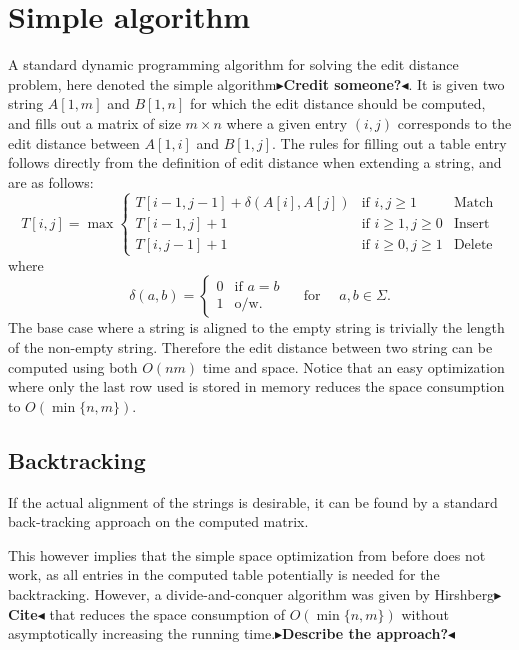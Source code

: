 \documentclass[twoside,11pt,openright]{report}
\newcommand{\todo}[1]{{\color[rgb]{.5,0,0}\textbf{$\blacktriangleright$#1$\blacktriangleleft$}}}
\newcommand{\str}[3]{#1[#2, #3]}
\begin{document}
\section{Simple algorithm}
\label{sec:intro:simple}
A standard dynamic programming algorithm for solving the edit distance problem, here denoted the simple algorithm\todo{Credit someone?}. It is given two string $\str{A}{1}{m}$ and $\str{B}{1}{n}$ for which the edit distance should be computed, and fills out a matrix of size $m \times n$ where a given entry $(i, j)$ corresponds to the edit distance between $\str{A}{1}{i}$ and $\str{B}{1}{j}$. The rules for filling out a table entry follows directly from the definition of edit distance when extending a string, and are as follows:
\[
  T[i, j] = \max \left\{ \begin{array}{lll}
              T[i - 1, j - 1] + \delta(A[i], A[j]) & \text{if } i, j \geq 1 & \text{Match} \\
              T[i - 1, j] + 1       & \text{if } i \geq 1, j \geq 0       & \text{Insert} \\
              T[i, j - 1] + 1       & \text{if } i \geq 0, j \geq 1       & \text{Delete}
            \end{array} \right.
\]
where
\[
  \delta(a, b) = \begin{cases}
                   0 & \text{if } a = b \\
                   1 & \text{o/w.}
                 \end{cases}
    \quad \text{ for } \quad a, b \in \Sigma.
\]
The base case where a string is aligned to the empty string is trivially the length of the non-empty string. Therefore the edit distance between two string can be computed using both $O(nm)$ time and space. Notice that an easy optimization where only the last row used is stored in memory reduces the space consumption to $O(\min\{n, m\})$.

\subsection{Backtracking}
If the actual alignment of the strings is desirable, it can be found by a standard back-tracking approach on the computed matrix.

This however implies that the simple space optimization from before does not work, as all entries in the computed table potentially is needed for the backtracking. However, a divide-and-conquer algorithm was given by Hirshberg\todo{Cite} that reduces the space consumption of $O(\min\{n, m\})$ without asymptotically increasing the running time.\todo{Describe the approach?}
\end{document}

